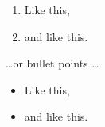 \documentclass{article}
\begin{document}
\begin{enumerate}
\item Like this,
\item and like this.
\end{enumerate}
\dots or bullet points \dots
\begin{itemize}
\item Like this,
\item and like this.
\end{itemize}
\end{document}
